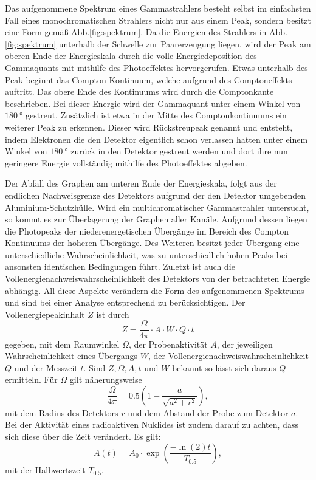 Das aufgenommene Spektrum eines Gammastrahlers besteht selbst im einfachsten Fall eines monochromatischen Strahlers nicht nur aus einem Peak, sondern besitzt eine Form gemäß Abb.\ref{fig:spektrum}. Da die Energien des Strahlers in Abb.\ref{fig:spektrum} unterhalb der Schwelle zur Paarerzeugung liegen, wird der Peak am oberen Ende der Energieskala durch die volle Energiedeposition des Gammaquants mit mithilfe des Photoeffektes hervorgerufen. Etwas unterhalb des Peak beginnt das Compton Kontinuum, welche aufgrund des Comptoneffekts auftritt. Das obere Ende des Kontinuums wird durch die Comptonkante beschrieben. Bei dieser Energie wird der Gammaquant unter einem Winkel von $\SI{180}{\degree}$ gestreut. Zusätzlich ist etwa in der Mitte des Comptonkontinuums ein weiterer Peak zu erkennen. Dieser wird Rückstreupeak genannt und entsteht, indem Elektronen die den Detektor eigentlich schon verlassen hatten unter einem Winkel von $\SI{180}{\degree}$ zurück in den Detektor gestreut werden und dort ihre nun geringere Energie vollständig mithilfe des Photoeffektes abgeben.

Der Abfall des Graphen am unteren Ende der Energieskala, folgt aus der endlichen Nachweisgrenze des Detektors aufgrund der den Detektor umgebenden Aluminium-Schutzhülle. Wird ein multichromatischer  Gammastrahler untersucht, so kommt es zur Überlagerung der Graphen aller Kanäle. Aufgrund dessen liegen die Photopeaks der niederenergetischen Übergänge im Bereich des Compton Kontinuums der höheren Übergänge. Des Weiteren besitzt jeder Übergang eine unterschiedliche Wahrscheinlichkeit, was zu unterschiedlich hohen Peaks bei ansonsten identischen Bedingungen führt. Zuletzt ist auch die Vollenergienachweiswahrscheinlichkeit des Detektors von der betrachteten Energie abhängig. All diese Aspekte verändern die Form des aufgenommenen Spektrums und sind bei einer Analyse entsprechend zu berücksichtigen. Der Vollenergiepeakinhalt $Z$ ist durch
\begin{equation}
    Z = \frac{\Omega}{4 \pi}\cdot A \cdot W \cdot Q \cdot t \label{eq:ZZZ}
\end{equation}
gegeben, mit dem Raumwinkel $\Omega$, der Probenaktivität $A$, der jeweiligen Wahrscheinlichkeit eines Übergangs $W$, der Vollenergienachweiswahrscheinlichkeit $Q$ und der Messzeit $t$. Sind $Z,\Omega,A,t$ und $W$ bekannt so lässt sich daraus $Q$ ermitteln. Für $\Omega$ gilt näherungsweise
\begin{equation}
    \frac{\Omega}{4 \pi} = 0.5 \left( 1- \frac{a}{\sqrt{a^2 + r^2}}\right) ,\label{eq:omega}
\end{equation}
mit dem Radius des Detektors $r$ und dem Abstand der Probe zum Detektor $a$. 
Bei der Aktivität eines radioaktiven Nuklides ist zudem darauf zu achten, dass sich diese über die Zeit verändert. Es gilt:
\begin{equation}
    A(t) = A_0 \cdot \exp\left(\frac{-\ln(2) t }{T_{0.5}}\right), \label{eq:AAA}
\end{equation}
mit der Halbwertszeit $T_{0.5}$.
